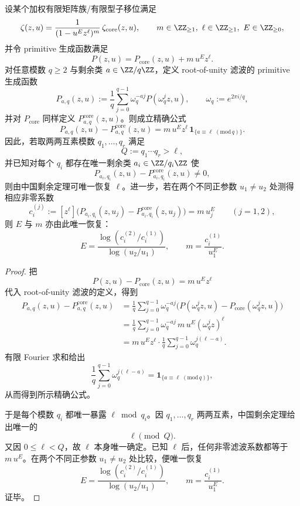 \begin{theorem}\label{thm:xi-primitive-surgery-finite-congruence-tomography}
设某个加权有限矩阵族/有限型子移位满足
\[
\zeta(z,u)=\frac{1}{(1-u^Ez^\ell)^m}\,\zeta_{\mathrm{core}}(z,u),
\qquad
m\in\ZZ_{\ge 1},\ \ell\in\ZZ_{\ge 1},\ E\in\ZZ_{\ge 0},
\]
并令 primitive 生成函数满足
\[
P(z,u)=P_{\mathrm{core}}(z,u)+m\,u^Ez^\ell.
\]
对任意模数 \(q\ge 2\) 与剩余类 \(a\in\ZZ/q\ZZ\)，定义 root-of-unity 滤波的 primitive 生成函数
\[
P_{a,q}(z,u):=\frac1q\sum_{j=0}^{q-1}\omega_q^{-aj}P(\omega_q^j z,u),
\qquad
\omega_q:=e^{2\pi i/q},
\]
并对 \(P_{\mathrm{core}}\) 同样定义 \(P^{\mathrm{core}}_{a,q}(z,u)\)。则成立精确公式
\[
\boxed{\;
P_{a,q}(z,u)-P^{\mathrm{core}}_{a,q}(z,u)
=
m\,u^E z^\ell\,
\mathbf 1_{\{a\equiv \ell\;(\mathrm{mod}\,q)\}}.\;}
\]
因此，若取两两互素模数 \(q_1,\dots,q_r\) 满足
\[
Q:=q_1\cdots q_r>\ell,
\]
并已知对每个 \(q_i\) 都存在唯一剩余类 \(a_i\in\ZZ/q_i\ZZ\) 使
\[
P_{a_i,q_i}(z,u)-P^{\mathrm{core}}_{a_i,q_i}(z,u)\neq 0,
\]
则由中国剩余定理可唯一恢复 \(\ell\)。进一步，若在两个不同正参数 \(u_1\neq u_2\) 处测得相应非零系数
\[
c_i^{(j)}
:=
\left[z^\ell\right]
\bigl(
P_{a_i,q_i}(z,u_j)-P^{\mathrm{core}}_{a_i,q_i}(z,u_j)
\bigr)
=
m\,u_j^E
\qquad (j=1,2),
\]
则 \(E\) 与 \(m\) 亦由此唯一恢复：
\[
E=\frac{\log(c_i^{(2)}/c_i^{(1)})}{\log(u_2/u_1)},
\qquad
m=\frac{c_i^{(1)}}{u_1^E}.
\]
\end{theorem}
\begin{proof}
把
\[
P(z,u)-P_{\mathrm{core}}(z,u)=m\,u^Ez^\ell
\]
代入 root-of-unity 滤波的定义，得到
\[
\begin{aligned}
P_{a,q}(z,u)-P^{\mathrm{core}}_{a,q}(z,u)
&=
\frac1q\sum_{j=0}^{q-1}\omega_q^{-aj}
\bigl(P(\omega_q^j z,u)-P_{\mathrm{core}}(\omega_q^j z,u)\bigr)\\
&=
\frac1q\sum_{j=0}^{q-1}\omega_q^{-aj}\,m\,u^E(\omega_q^j z)^\ell\\
&=
m\,u^Ez^\ell\cdot
\frac1q\sum_{j=0}^{q-1}\omega_q^{j(\ell-a)}.
\end{aligned}
\]
有限 Fourier 求和给出
\[
\frac1q\sum_{j=0}^{q-1}\omega_q^{j(\ell-a)}
=
\mathbf 1_{\{a\equiv \ell\;(\mathrm{mod}\,q)\}},
\]
从而得到所示精确公式。

于是每个模数 \(q_i\) 都唯一暴露 \(\ell\bmod q_i\)。因 \(q_1,\dots,q_r\) 两两互素，中国剩余定理给出唯一的
\[
\ell \pmod Q.
\]
又因 \(0\le \ell<Q\)，故 \(\ell\) 本身唯一确定。已知 \(\ell\) 后，任何非零滤波系数都等于 \(m\,u^E\)。在两个不同正参数 \(u_1\neq u_2\) 处比较，便唯一恢复
\[
E=\frac{\log(c_i^{(2)}/c_i^{(1)})}{\log(u_2/u_1)},
\qquad
m=\frac{c_i^{(1)}}{u_1^E}.
\]
证毕。
\end{proof}

